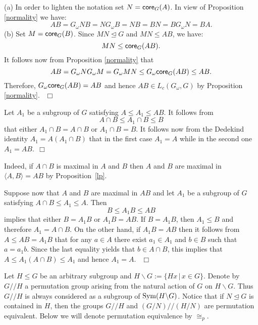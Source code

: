 \documentclass{amsart}
\begin{document}
{} (a) In order to lighten the notation set $N={{\sf core}}_G(A)$. In view of Proposition \ref{normality} we have: $$AB = G_\omega N B =
N G_\omega B = NB=B N = B G_\omega N = BA.
$$
(b) Set $M={{\sf core}}_G(B)$. Since $MN{\trianglelefteq} G$ and $MN\leq AB$, we have: $$MN\leq{{\sf core}}_G(AB).$$
It follows now from Proposition \ref{normality} that
$$AB = G_\omega N G_\omega M= G_\omega MN\leq G_\omega {{\sf core}}_G(AB)\leq AB.$$ Therefore,
$G_\omega {{\sf core}}_G(AB)= AB$ and hence
$AB\in L_c(G_\omega, G)$ by Proposition \ref{normality}.
{$\ \ \Box$ \vskip 0.2cm}


{} Let $A_1$ be a subgroup of $G$ satisfying $A \leq A_1 \leq AB$. It follows from
$$A\cap B\leq A_1\cap B \leq B$$ that either $A_1\cap B = A\cap B$
or $A_1\cap B= B$. It follows now from the
Dedekind identity $A_1 = A (A_1\cap B)$ that in the first case $A_1=A$ while in the second one $A_1 = AB$.{$\ \ \Box$ \vskip 0.2cm}

{} Indeed, if $A\cap B$ is maximal in $A$ and $B$
then $A$ and $B$ are maximal in ${\langle{{A,B}}\rangle} = AB$
by Proposition~\ref{lp}.

Suppose now that $A$ and $B$ are maximal
in $AB$ and let $A_1$ be a subgroup of $G$ satisfying $A\cap B\leq A_1\leq A$. Then
$$B\leq A_1B\leq AB$$ implies that
either $B=A_1B$ or $A_1B = AB$. If $B=A_1B$,
then $A_1\leq B$ and therefore $A_1 = A\cap B.$
On the other hand, if $A_1B = AB$ then it follows from $A\leq AB=A_1B$ that for any
$a\in A$ there exist $a_1\in A_1$ and $b\in B$ such that $a=a_1 b$. Since the last equality yields that
$b\in A\cap B$, this implies that $A\leq A_1(A\cap B)\leq A_1$ and hence $A_1=A.$ {$\ \ \Box$ \vskip 0.2cm}

Let $H\leq G$ be an arbitrary subgroup and $H\backslash G:=\{Hx\,|\,x\in G\}$.
Denote by $G//H$ a permutation group arising from the natural action of $G$ on
$H\backslash G$. Thus $G//H$ is always considered as a subgroup of ${{\rm Sym}}(H\backslash G)$.
Notice that if $N{\trianglelefteq} G$ is contained in $H$, then the groups $G//H$ and $(G/N)//(H/N)$
are permutation equivalent.
Below we will denote permutation equivalence by $\cong_p$.
\end{document}
